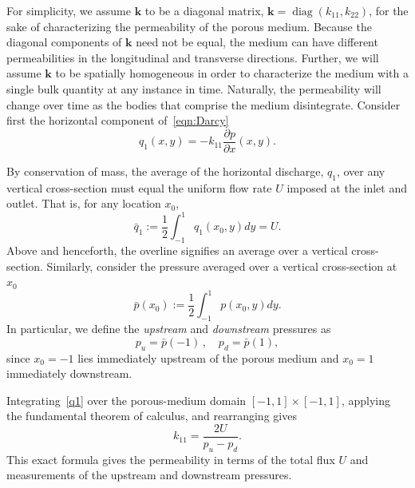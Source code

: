 \documentclass[3p]{elsarticle}
\newcommand{\pderiv}[2]{\frac{\partial #1}{\partial #2}}
\newcommand{\bvec}[1]{\mathbf{#1}}
\newcommand{\qavg}{\bar{q}}
\newcommand{\pavg}{\bar{p}}
\newcommand{\pup}{p_u}
\newcommand{\pdn}{p_d}
\newcommand{\diag}{\mathop{\mathrm{diag}}}
\begin{document}

For simplicity, we assume $\bvec{k}$ to be a diagonal matrix, $\bvec{k}
= \diag(k_{11}, k_{22})$, for the sake of characterizing the
permeability of the porous medium. Because the diagonal components of
$\bvec{k}$ need not be equal, the medium can have different
permeabilities in the longitudinal and transverse directions. Further,
we will assume $\bvec{k}$ to be spatially homogeneous in order to
characterize the medium with a single bulk quantity at any instance in
time. Naturally, the permeability will change over time as the bodies
that comprise the medium disintegrate. Consider first the horizontal
component of~\eqref{eqn:Darcy}
\begin{equation}
  \label{q1}
  q_1(x,y) = -k_{11} \pderiv{p}{x}(x,y).
\end{equation}

By conservation of mass, the average of the horizontal discharge, $q_1$, over any vertical cross-section must equal the uniform flow rate $U$ imposed at the inlet and outlet. That is, for any location $x_0$,
\begin{equation}
\qavg_1 := \frac{1}{2} \int_{-1}^{1} q_1(x_0, y) dy = U.
\end{equation}
Above and henceforth, the overline signifies an average over a vertical cross-section. Similarly, consider the pressure averaged over a vertical cross-section at $x_0$
\begin{equation}
  \pavg(x_0) := \frac{1}{2} \int_{-1}^{1} p(x_0, y) dy.
\end{equation}
In particular, we define the {\em upstream} and {\em downstream} pressures as
\begin{equation}
  \pup = \pavg(-1) \, , \quad \pdn = \pavg(1),
\end{equation}
since $x_0 = -1$ lies immediately upstream of the porous medium and $x_0 = 1$ immediately downstream.

Integrating~\eqref{q1} over the porous-medium domain $[-1, 1] \times [-1,1]$, applying the fundamental theorem of calculus, and rearranging gives
\begin{equation}
  \label{eqn:k11}
  k_{11} = \frac{2U}{\pup - \pdn}.
\end{equation}
This exact formula gives the permeability in terms of the total flux $U$
and measurements of the upstream and downstream pressures.
\end{document}
